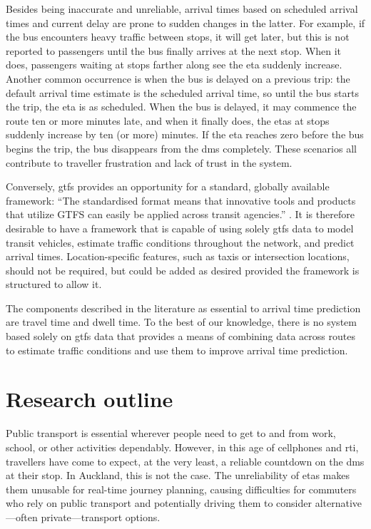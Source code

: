 Besides being inaccurate and unreliable, arrival times based on scheduled arrival times and current delay are prone to sudden changes in the latter. For example, if the bus encounters heavy traffic between stops, it will get later, but this is not reported to passengers until the bus finally arrives at the next stop. When it does, passengers waiting at stops farther along see the \gls{eta} suddenly increase. Another common occurrence is when the bus is delayed on a previous trip: the default arrival time estimate is the scheduled arrival time, so until the bus starts the trip, the \gls{eta} is as scheduled. When the bus is delayed, it may commence the route ten or more minutes late, and when it finally does, the \glspl{eta} at stops suddenly increase by ten (or more) minutes. If the \gls{eta} reaches zero before the bus begins the trip, the bus disappears from the \gls{dms} completely. These scenarios all contribute to traveller frustration and lack of trust in the system.


Conversely, \gls{gtfs} provides an opportunity for a standard, globally available framework: ``The standardised format means that innovative tools and products that utilize GTFS can easily be applied across transit agencies.'' \citep[26]{TCRP_2020}. It is therefore desirable to have a framework that is capable of using solely \gls{gtfs} data to model transit vehicles, estimate traffic conditions throughout the network, and predict arrival times. Location-specific features, such as taxis or intersection locations, should not be required, but could be added as desired provided the framework is structured to allow it.


The components described in the literature as essential to arrival time prediction are travel time and dwell time. To the best of our knowledge, there is no system based solely on \gls{gtfs} data that provides a means of combining data across routes to estimate traffic conditions and use them to improve arrival time prediction.



\section{Research outline}
\label{sec:proposal}

Public transport is essential wherever people need to get to and from work, school, or other activities dependably. However, in this age of cellphones and \gls{rti}, travellers have come to expect, at the very least, a reliable countdown on the \gls{dms} at their stop. In Auckland, this is not the case. The unreliability of \glspl{eta} makes them unusable for real-time journey planning, causing difficulties for commuters who rely on public transport and potentially driving them to consider alternative---often private---transport options.


